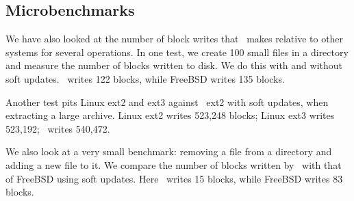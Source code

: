 \begin{comment}
\begin{figure}[htb]
\centering
\texttt{[image: opts-patches]}
\texttt{[image: opts-rollback]}
\begin{tabular}{|l|r|r|} \hline
Optimization & Untar (sys sec) & Delete (sys sec) \\ \hline\hline
None & 4.42 & 1.14 \\ \hline\hline
\Nrb\ \Chdescs{} & 4.53 & 1.08 \\ \hline
Overlap Merge & 3.58 & 0.85 \\ \hline\hline
HP $+$ OM & 3.58 & 0.75 \\ \hline
\end{tabular}
\caption{Effects of \nrb\ \chdescs\ with \nrb\ merging and overlap
merging for the untar and rm tests.}
\label{fig:opts}
\end{figure}
\end{comment}

\begin{comment}
\begin{figure}[htb]
\vspace{-0.5\baselineskip}
\centering{
\texttt{[image: rb\_chdesc\_size]}
}
\vspace{-0.5\baselineskip}
\caption{\label{fig:patchsize-histo} \Rb\ \chdesc\ size histogram for a sample
workload (extracting a large archive into ext2). All the \chdescs\ larger than
63 bytes have been optimized into \nrb\ \chdescs. \Rb\ \chdescs\ 4 bytes and
smaller account for about 51\% of all \rb\ \chdescs.}
\end{figure}
\end{comment}

\subsection {Microbenchmarks}
We have also looked at the number of block writes that \Kudos\ makes
relative to other systems for several operations. In one test, we
create 100 small files in a directory and measure the number of blocks
written to disk. We do this with and without soft updates. \Kudos\
writes 122 blocks, while FreeBSD writes 135 blocks.

Another test pits Linux ext2 and ext3 against \Kudos\ ext2 with soft updates,
when extracting a large archive. Linux ext2 writes 523,248 blocks; Linux ext3
writes 523,192; \Kudos\ writes 540,472.

We also look at a very small benchmark: removing a file from a
directory and adding a new file to it. We compare the number of blocks
written by \Kudos\ with that of FreeBSD using soft updates. Here
\Kudos\ writes 15 blocks, while FreeBSD writes 83 blocks.

